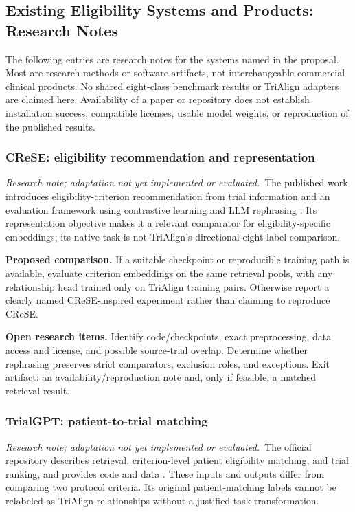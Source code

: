 \documentclass[10pt,letterpaper]{article}
\newcommand{\research}{\textit{Research note; adaptation not yet implemented or evaluated.}}
\begin{document}
\subsection{Existing Eligibility Systems and Products: Research Notes}
\label{sec:systems}
The following entries are research notes for the systems named in the
proposal. Most are research methods or software artifacts, not interchangeable
commercial clinical products. No shared eight-class benchmark results or
TriAlign adapters are claimed here. Availability of a paper or repository
does not establish installation success, compatible licenses, usable model
weights, or reproduction of the published results.

\subsubsection{CReSE: eligibility recommendation and representation}
\research\ The published work introduces eligibility-criterion recommendation
from trial information and an evaluation framework using contrastive learning
and LLM rephrasing \cite{crese}. Its representation objective makes it a
relevant comparator for eligibility-specific embeddings; its native task is
not TriAlign's directional eight-label comparison.

\textbf{Proposed comparison.} If a suitable checkpoint or reproducible
training path is available, evaluate criterion embeddings on the same
retrieval pools, with any relationship head trained only on TriAlign training
pairs. Otherwise report a clearly named CReSE-inspired experiment rather
than claiming to reproduce CReSE.

\textbf{Open research items.} Identify code/checkpoints, exact preprocessing,
data access and license, and possible source-trial overlap. Determine whether
rephrasing preserves strict comparators, exclusion roles, and exceptions.
Exit artifact: an availability/reproduction note and, only if feasible, a
matched retrieval result.

\subsubsection{TrialGPT: patient-to-trial matching}
\research\ The official repository describes retrieval, criterion-level
patient eligibility matching, and trial ranking, and provides code and data
\cite{trialgptcode}. These inputs and outputs differ from comparing two
protocol criteria. Its original patient-matching labels cannot be relabeled
as TriAlign relationships without a justified task transformation.
\end{document}
